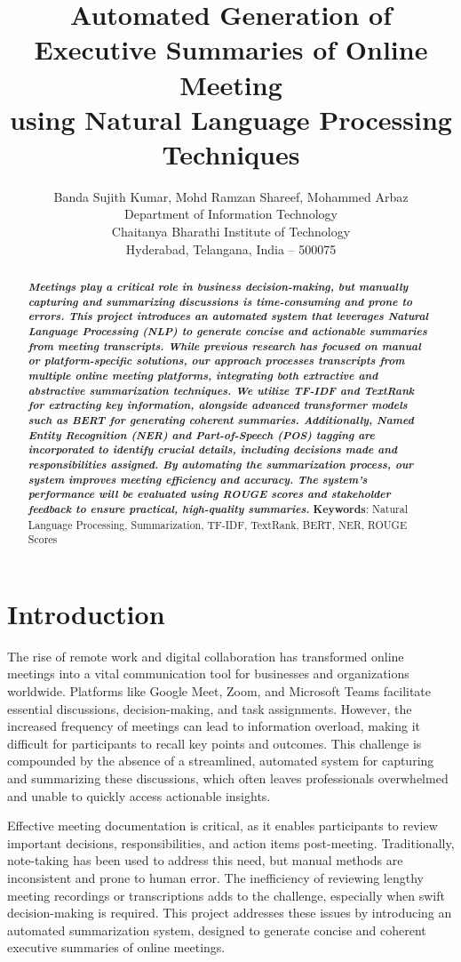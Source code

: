 \documentclass{article}
\title{Automated Generation of Executive Summaries of Online Meeting \\
using Natural Language Processing Techniques}
\author{
    Banda Sujith Kumar, Mohd Ramzan Shareef, Mohammed Arbaz \\
    Department of Information Technology \\
    Chaitanya Bharathi Institute of Technology \\
    Hyderabad, Telangana, India – 500075 \\
}
\begin{document}
\maketitle
\begin{abstract}
\textbf{\textit{
Meetings play a critical role in business decision-making, but manually capturing and summarizing discussions is time-consuming and prone to errors. This project introduces an automated system that leverages Natural Language Processing (NLP) to generate concise and actionable summaries from meeting transcripts. While previous research has focused on manual or platform-specific solutions, our approach processes transcripts from multiple online meeting platforms, integrating both extractive and abstractive summarization techniques. We utilize TF-IDF and TextRank for extracting key information, alongside advanced transformer models such as BERT for generating coherent summaries. Additionally, Named Entity Recognition (NER) and Part-of-Speech (POS) tagging are incorporated to identify crucial details, including decisions made and responsibilities assigned. By automating the summarization process, our system improves meeting efficiency and accuracy. The system's performance will be evaluated using ROUGE scores and stakeholder feedback to ensure practical, high-quality summaries.
}}
\textbf{Keywords}: Natural Language Processing, Summarization, TF-IDF, TextRank, BERT, NER, ROUGE Scores
\end{abstract}

\section{Introduction}

The rise of remote work and digital collaboration has transformed online meetings into a vital communication tool for businesses and organizations worldwide. Platforms like Google Meet, Zoom, and Microsoft Teams facilitate essential discussions, decision-making, and task assignments. However, the increased frequency of meetings can lead to information overload, making it difficult for participants to recall key points and outcomes. This challenge is compounded by the absence of a streamlined, automated system for capturing and summarizing these discussions, which often leaves professionals overwhelmed and unable to quickly access actionable insights.

Effective meeting documentation is critical, as it enables participants to review important decisions, responsibilities, and action items post-meeting. Traditionally, note-taking has been used to address this need, but manual methods are inconsistent and prone to human error. The inefficiency of reviewing lengthy meeting recordings or transcriptions adds to the challenge, especially when swift decision-making is required. This project addresses these issues by introducing an automated summarization system, designed to generate concise and coherent executive summaries of online meetings.
\end{document}
